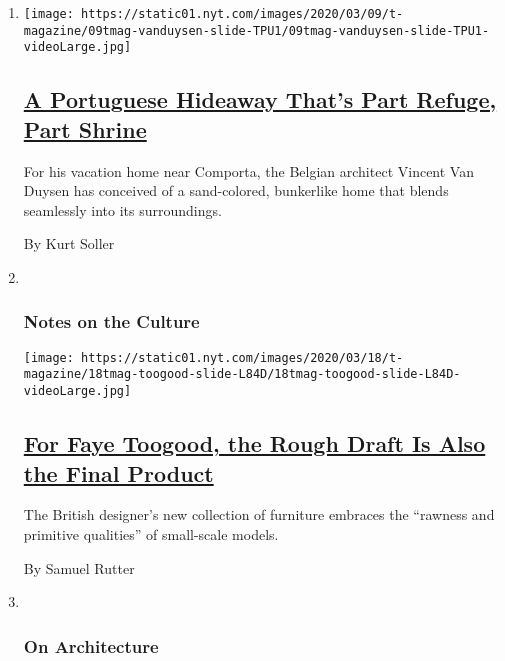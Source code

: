 \begin{enumerate}
\def\labelenumi{\arabic{enumi}.}
\item
  \texttt{[image: https://static01.nyt.com/images/2020/03/09/t-magazine/09tmag-vanduysen-slide-TPU1/09tmag-vanduysen-slide-TPU1-videoLarge.jpg]}

  \hypertarget{a-portuguese-hideaway-thats-part-refuge-part-shrine}{%
  \subsection{\texorpdfstring{\href{/2020/03/09/t-magazine/portugal-home-vincent-van-duysen.html}{A
  Portuguese Hideaway That's Part Refuge, Part
  Shrine}}{A Portuguese Hideaway That's Part Refuge, Part Shrine}}\label{a-portuguese-hideaway-thats-part-refuge-part-shrine}}

  For his vacation home near Comporta, the Belgian architect Vincent Van
  Duysen has conceived of a sand-colored, bunkerlike home that blends
  seamlessly into its surroundings.

  By Kurt Soller
\item ~
  \hypertarget{notes-on-the-culture}{%
  \subsubsection{Notes on the Culture}\label{notes-on-the-culture}}

  \texttt{[image: https://static01.nyt.com/images/2020/03/18/t-magazine/18tmag-toogood-slide-L84D/18tmag-toogood-slide-L84D-videoLarge.jpg]}

  \hypertarget{for-faye-toogood-the-rough-draft-is-also-the-final-product}{%
  \subsection{\texorpdfstring{\href{/2020/03/18/t-magazine/faye-toogood-maquette-show.html}{For
  Faye Toogood, the Rough Draft Is Also the Final
  Product}}{For Faye Toogood, the Rough Draft Is Also the Final Product}}\label{for-faye-toogood-the-rough-draft-is-also-the-final-product}}

  The British designer's new collection of furniture embraces the
  ``rawness and primitive qualities'' of small-scale models.

  By Samuel Rutter
\item ~
  \hypertarget{on-architecture}{%
  \subsubsection{On Architecture}\label{on-architecture}}


\end{enumerate}
